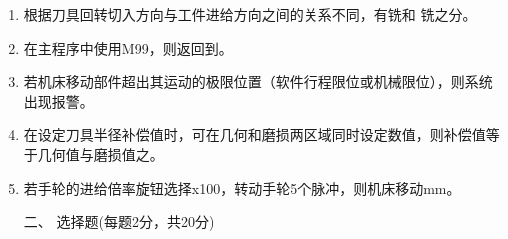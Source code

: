 \documentclass[12pt,twocolumn,landscape,UTF8,twoside]{ctexart}
\begin{document}
\begin{spacing}{1.3}
\begin{enumerate} [1、]
		
		\item 根据刀具回转切入方向与工件进给方向之间的关系不同，有铣和		铣之分。
		
		
		
		
		\item 在主程序中使用M99，则返回到。





		\item 若机床移动部件超出其运动的极限位置（软件行程限位或机械限位），则系统出现报警。

		\item 在设定刀具半径补偿值时，可在几何和磨损两区域同时设定数值，则补偿值等于几何值与磨损值之。

		\item 若手轮的进给倍率旋钮选择x100，转动手轮5个脉冲，则机床移动mm。
		
\vspace{1cm}

\item[\heiti 二、] {\heiti 选择题(每题2分，共20分)}	
		

\end{enumerate}
\end{spacing}
\end{document}
